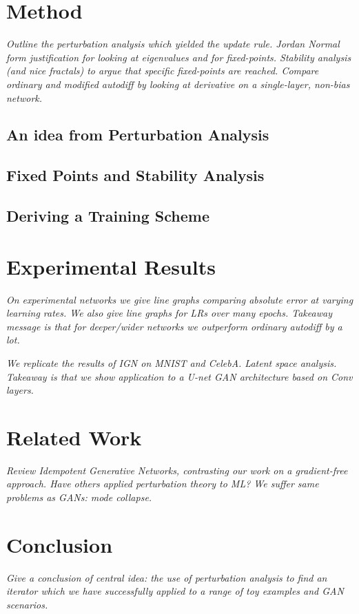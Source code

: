 \documentclass{article}
\begin{document}
\section{Method}
\label{sec:method}
\textit{Outline the perturbation analysis which yielded the update rule. Jordan Normal form justification for looking at eigenvalues and for fixed-points. Stability analysis (and nice fractals) to argue that specific fixed-points are reached. Compare ordinary and modified autodiff by looking at derivative on a single-layer, non-bias network.}

\subsection{An idea from Perturbation Analysis}

\subsection{Fixed Points and Stability Analysis}

\subsection{Deriving a Training Scheme}

\section{Experimental Results}
\label{sec:experiment}
\textit{On experimental networks we give line graphs comparing absolute error at varying learning rates. We also give line graphs for LRs over many epochs. Takeaway message is that for deeper/wider networks we outperform ordinary autodiff by a lot.}

\textit{We replicate the results of IGN on MNIST and CelebA. Latent space analysis. Takeaway is that we show application to a U-net GAN architecture based on Conv layers.}

\section{Related Work}
\label{sec:related}
\textit{Review Idempotent Generative Networks, contrasting our work on a gradient-free approach. Have others applied perturbation theory to ML? We suffer same problems as GANs: mode collapse.}

\section{Conclusion}
\label{sec:conclusion}
\textit{Give a conclusion of central idea: the use of perturbation analysis to find an iterator which we have successfully applied to a range of toy examples and GAN scenarios.}
\end{document}
